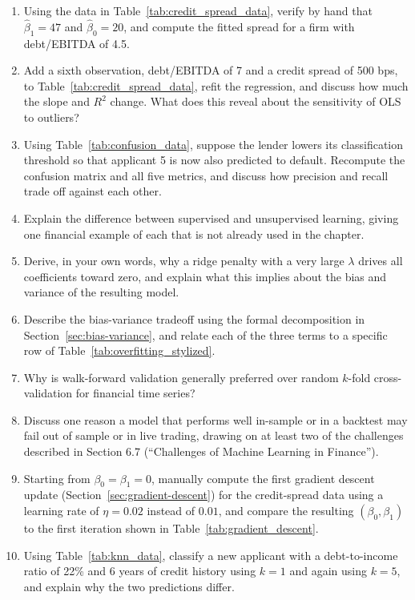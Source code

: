 \documentclass[../ai_in_finance]{subfiles}
\begin{document}
\begin{enumerate}
    \item Using the data in Table~\ref{tab:credit_spread_data}, verify by hand that $\hat\beta_1 = 47$ and $\hat\beta_0 = 20$, and compute the fitted spread for a firm with debt/EBITDA of 4.5.
    \item Add a sixth observation, debt/EBITDA of 7 and a credit spread of 500 bps, to Table~\ref{tab:credit_spread_data}, refit the regression, and discuss how much the slope and $R^2$ change. What does this reveal about the sensitivity of OLS to outliers?
    \item Using Table~\ref{tab:confusion_data}, suppose the lender lowers its classification threshold so that applicant 5 is now also predicted to default. Recompute the confusion matrix and all five metrics, and discuss how precision and recall trade off against each other.
    \item Explain the difference between supervised and unsupervised learning, giving one financial example of each that is not already used in the chapter.
    \item Derive, in your own words, why a ridge penalty with a very large $\lambda$ drives all coefficients toward zero, and explain what this implies about the bias and variance of the resulting model.
    \item Describe the bias-variance tradeoff using the formal decomposition in Section~\ref{sec:bias-variance}, and relate each of the three terms to a specific row of Table~\ref{tab:overfitting_stylized}.
    \item Why is walk-forward validation generally preferred over random $k$-fold cross-validation for financial time series?
    \item Discuss one reason a model that performs well in-sample or in a backtest may fail out of sample or in live trading, drawing on at least two of the challenges described in Section 6.7 (``Challenges of Machine Learning in Finance'').
    \item Starting from $\beta_0=\beta_1=0$, manually compute the first gradient descent update (Section~\ref{sec:gradient-descent}) for the credit-spread data using a learning rate of $\eta=0.02$ instead of $0.01$, and compare the resulting $(\beta_0,\beta_1)$ to the first iteration shown in Table~\ref{tab:gradient_descent}.
    \item Using Table~\ref{tab:knn_data}, classify a new applicant with a debt-to-income ratio of 22\% and 6 years of credit history using $k=1$ and again using $k=5$, and explain why the two predictions differ.

\end{enumerate}
\end{document}
